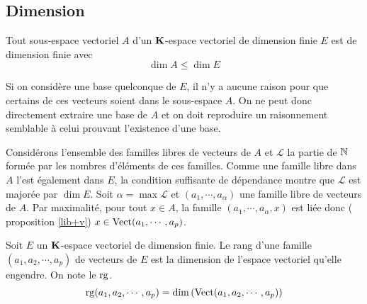 \subsection{Dimension}
\begin{propn}
Tout sous-espace vectoriel $A$ d'un $\mathbf{K}$-espace vectoriel de dimension finie $E$ est de dimension finie avec
\begin{displaymath}
 \dim A \leq \dim E
\end{displaymath} 
\end{propn}
\begin{rem}
  Si on considère une base quelconque de $E$, il n'y a aucune raison pour que certains de ces vecteurs soient dans le sous-espace $A$. On ne peut donc directement extraire une base de $A$ et on doit reproduire un raisonnement semblable à celui prouvant l'existence d'une base. 
\end{rem}
\begin{demo}
Considérons l'ensemble des familles libres de vecteurs de $A$ et $\mathcal{L}$ la partie de $\mathbb{N}$ formée par les nombres d'éléments de ces familles. Comme une famille libre dans $A$ l'est également dans $E$, la condition suffisante de dépendance montre que $\mathcal{L}$ est majorée par $\dim E$. Soit $\alpha =\max \mathcal{L}$ et $(a_1,\cdots,a_\alpha)$ une famille libre de vecteurs de $A$. Par maximalité, pour tout $x\in A$, la famille $(a_1,\cdots,a_\alpha,x)$ est liée donc ( proposition \ref{lib+v}) $x\in \mathop{\mathrm{Vect}}(a_1,\cdots,a_p)$.
\end{demo}
\begin{defi}
 Soit $E$ un $\mathbf{K}$-espace vectoriel de dimension finie. Le rang d'une famille  $(a_1,a_2,\cdots,a_p)$ de vecteurs de $E$ est la dimension de l'espace vectoriel qu'elle engendre. On note le $\mathop{\mathrm{rg}}$.
\begin{displaymath}
 \mathop{\mathrm{rg}} (a_1,a_2,\cdots,a_p) = \dim \left( \mathop{\mathrm{Vect}}(a_1,a_2,\cdots,a_p)\right) 
\end{displaymath}
\end{defi}


